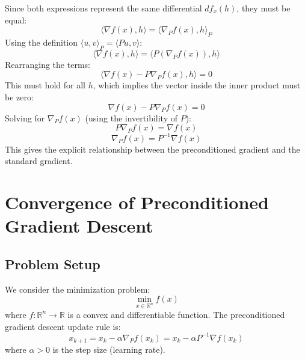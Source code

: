 \documentclass{article}
\newcommand{\R}{\mathbb{R}}
\newcommand{\ip}[2]{\langle #1, #2 \rangle} %
\newcommand{\grad}{\nabla}             %
\newcommand{\gradp}{\nabla_P}
\newcommand{\ipp}[2]{\langle #1, #2 \rangle_P} %
\begin{document}
Since both expressions represent the same differential $df_x(h)$, they must be equal:
\begin{equation*}
    \ip{\grad f(x)}{h} = \ipp{\gradp f(x)}{h}
\end{equation*}
Using the definition $\ipp{u}{v} = \ip{Pu}{v}$:
\begin{equation*}
    \ip{\grad f(x)}{h} = \ip{P (\gradp f(x))}{h}
\end{equation*}
Rearranging the terms:
\begin{equation*}
    \ip{\grad f(x) - P \gradp f(x)}{h} = 0
\end{equation*}
This must hold for all $h$, which implies the vector inside the inner product must be zero:
\begin{equation*}
    \grad f(x) - P \gradp f(x) = 0
\end{equation*}
Solving for $\gradp f(x)$ (using the invertibility of $P$):
\begin{equation*}
    P \gradp f(x) = \grad f(x)
\end{equation*}
\begin{equation} \label{eq:gradp_explicit_app}
    \boxed{\gradp f(x) = P^{-1} \grad f(x)}
\end{equation}
This gives the explicit relationship between the preconditioned gradient and the standard gradient.

\vspace{\baselineskip}

\section*{Convergence of Preconditioned Gradient Descent}

\subsection*{Problem Setup}
We consider the minimization problem:
\begin{equation*}
    \min_{x \in \R^n} f(x)
\end{equation*}
where $f: \R^n \to \R$ is a convex and differentiable function.
The preconditioned gradient descent update rule is:
\begin{equation} \label{eq:pgd_update}
    x_{k+1} = x_k - \alpha \gradp f(x_k) = x_k - \alpha P^{-1} \grad f(x_k)
\end{equation}
where $\alpha > 0$ is the step size (learning rate).
\end{document}

